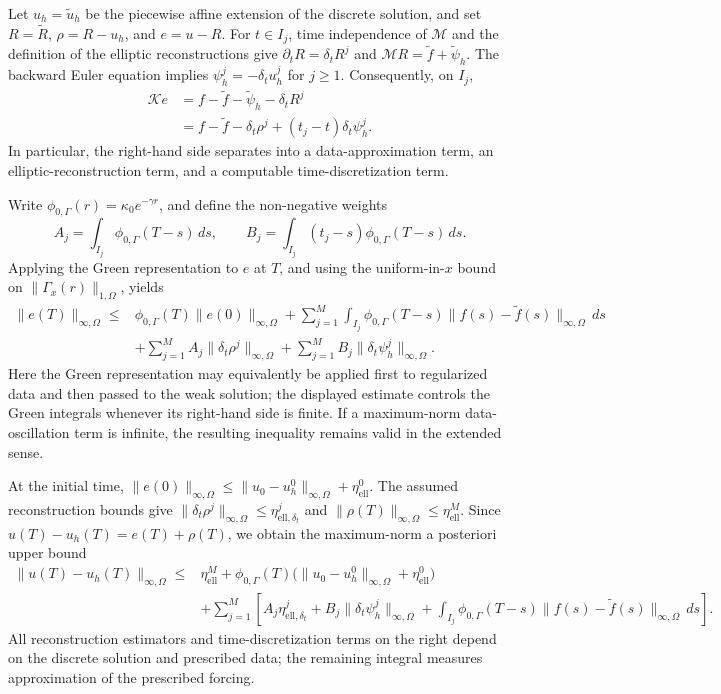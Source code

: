 \documentclass{article}
\begin{document}
Let \(u_h=\widetilde u_h\) be the piecewise affine extension of the discrete solution, and set \(R=\widetilde R\), \(\rho=R-u_h\), and \(e=u-R\). For \(t\in I_j\), time independence of \(\mathcal M\) and the definition of the elliptic reconstructions give \(\partial_tR=\delta_tR^j\) and \(\mathcal MR=\widetilde f+\widetilde\psi_h\). The backward Euler equation implies \(\psi_h^j=-\delta_tu_h^j\) for \(j\geq1\). Consequently, on \(I_j\),
\[
\begin{aligned}
\mathcal K e
&=f-\widetilde f-\widetilde\psi_h-\delta_tR^j\\
&=f-\widetilde f-\delta_t\rho^j+(t_j-t)\delta_t\psi_h^j.
\end{aligned}
\]
In particular, the right-hand side separates into a data-approximation term, an elliptic-reconstruction term, and a computable time-discretization term.

Write \(\phi_{0,\Gamma}(r)=\kappa_0e^{-\gamma r}\), and define the non-negative weights
\[
A_j=\int_{I_j}\phi_{0,\Gamma}(T-s)\,ds,
\qquad
B_j=\int_{I_j}(t_j-s)\phi_{0,\Gamma}(T-s)\,ds.
\]
Applying the Green representation to \(e\) at \(T\), and using the uniform-in-\(x\) bound on \(\|\Gamma_x(r)\|_{1,\Omega}\), yields
\[
\begin{aligned}
\|e(T)\|_{\infty,\Omega}
\leq{}&\phi_{0,\Gamma}(T)\|e(0)\|_{\infty,\Omega}
+\sum_{j=1}^M\int_{I_j}\phi_{0,\Gamma}(T-s)
       \|f(s)-\widetilde f(s)\|_{\infty,\Omega}\,ds\\
&+\sum_{j=1}^M A_j\|\delta_t\rho^j\|_{\infty,\Omega}
 +\sum_{j=1}^M B_j\|\delta_t\psi_h^j\|_{\infty,\Omega}.
\end{aligned}
\]
Here the Green representation may equivalently be applied first to regularized data and then passed to the weak solution; the displayed estimate controls the Green integrals whenever its right-hand side is finite. If a maximum-norm data-oscillation term is infinite, the resulting inequality remains valid in the extended sense.

At the initial time, \(\|e(0)\|_{\infty,\Omega}\leq\|u_0-u_h^0\|_{\infty,\Omega}+\eta_{\mathrm{ell}}^0\). The assumed reconstruction bounds give \(\|\delta_t\rho^j\|_{\infty,\Omega}\leq\eta_{\mathrm{ell},\delta_t}^j\) and \(\|\rho(T)\|_{\infty,\Omega}\leq\eta_{\mathrm{ell}}^M\). Since \(u(T)-u_h(T)=e(T)+\rho(T)\), we obtain the maximum-norm a posteriori upper bound
\[
\boxed{\begin{aligned}
\|u(T)-u_h(T)\|_{\infty,\Omega}\leq{}&
\eta_{\mathrm{ell}}^M
+\phi_{0,\Gamma}(T)
 \bigl(\|u_0-u_h^0\|_{\infty,\Omega}+\eta_{\mathrm{ell}}^0\bigr)\\
&+\sum_{j=1}^M\left[
 A_j\eta_{\mathrm{ell},\delta_t}^j
 +B_j\|\delta_t\psi_h^j\|_{\infty,\Omega}
 +\int_{I_j}\phi_{0,\Gamma}(T-s)
       \|f(s)-\widetilde f(s)\|_{\infty,\Omega}\,ds
 \right].
\end{aligned}}
\]
All reconstruction estimators and time-discretization terms on the right depend on the discrete solution and prescribed data; the remaining integral measures approximation of the prescribed forcing.
\end{document}

